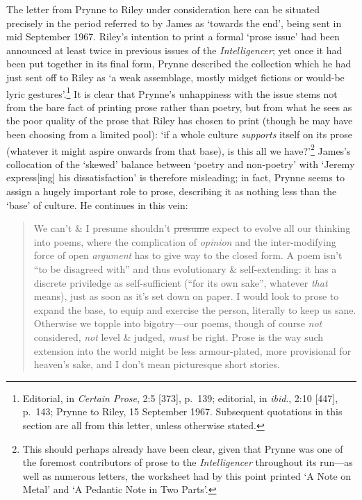 \documentclass[]{article}
\begin{document}
The letter from Prynne to Riley under consideration here can be situated
precisely in the period referred to by James as ‘towards the end’, being
sent in mid September 1967. Riley’s intention to print a formal ‘prose
issue’ had been announced at least twice in previous issues of the
\emph{Intelligencer}; yet once it had been put together in its final
form, Prynne described the collection which he had just sent off to
Riley as ‘a weak assemblage, mostly midget fictions or would-be lyric
gestures’.\footnote{Editorial, in \emph{Certain Prose}, 2:5 {[}373{]},
  p.~139; editorial, in \emph{ibid}., 2:10 {[}447{]}, p.~143; Prynne to
  Riley, 15 September 1967. Subsequent quotations in this section are
  all from this letter, unless otherwise stated.} It is clear that
Prynne’s unhappiness with the issue stems not from the bare fact of
printing prose rather than poetry, but from what he sees as the poor
quality of the prose that Riley has chosen to print (though he may have
been choosing from a limited pool): ‘if a whole culture \emph{supports}
itself on its prose (whatever it might aspire onwards from that base),
is this all we have?’\footnote{This should perhaps already have been
  clear, given that Prynne was one of the foremost contributors of prose
  to the \emph{Intelligencer} throughout its run—as well as numerous
  letters, the worksheet had by this point printed ‘A Note on Metal’ and
  ‘A Pedantic Note in Two Parts’.} James’s collocation of the ‘skewed’
balance between ‘poetry and non-poetry’ with ‘Jeremy express{[}ing{]}
his dissatisfaction’ is therefore misleading; in fact, Prynne seems to
assign a hugely important role to prose, describing it as nothing less
than the ‘base’ of culture. He continues in this vein:

\begin{quote}
\singlespacing We can’t \& I presume shouldn’t \sout{presume} expect to
evolve all our thinking into poems, where the complication of
\emph{opinion} and the inter-modifying force of open \emph{argument} has
to give way to the closed form. A poem isn’t “to be disagreed with” and
thus evolutionary \& self-extending: it has a discrete priviledge as
self-sufficient (“for its own sake”, whatever \emph{that} means), just
as soon as it’s set down on paper. I would look to prose to expand the
base, to equip and exercise the person, literally to keep us sane.
Otherwise we topple into bigotry—our poems, though of course \emph{not}
considered, \emph{not} level \& judged, \emph{must} be right. Prose is
the way such extension into the world might be less armour-plated, more
provisional for heaven’s sake, and I don’t mean picturesque short
stories.
\end{quote}
\end{document}

